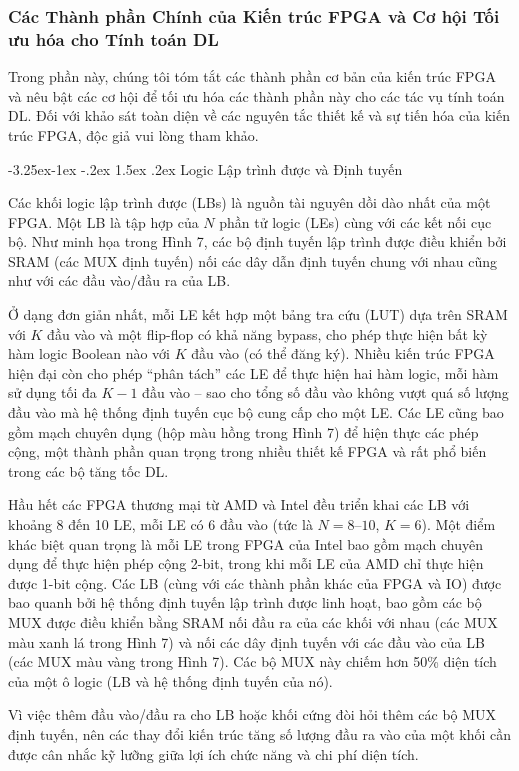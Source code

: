 \documentclass[a4paper]{article}
\makeatletter
\newcounter {subsubsubsection}[subsubsection]
\newcommand\subsubsubsection{\@startsection{subsubsubsection}{4}{\z@}%
                                     {-3.25ex\@plus -1ex \@minus -.2ex}%
                                     {1.5ex \@plus .2ex}%
                                     {\normalfont\normalsize\bfseries}}
\makeatother
\begin{document}
\subsubsection{Các Thành phần Chính của Kiến trúc FPGA và Cơ hội Tối ưu hóa cho Tính toán DL}
Trong phần này, chúng tôi tóm tắt các thành phần cơ bản của kiến trúc FPGA và nêu bật các cơ hội để tối ưu hóa các thành phần này cho các tác vụ tính toán DL. Đối với khảo sát toàn diện về các nguyên tắc thiết kế và sự tiến hóa của kiến trúc FPGA, độc giả vui lòng tham khảo.

\subsubsubsection{Logic Lập trình được và Định tuyến}

Các khối logic lập trình được (LBs) là nguồn tài nguyên dồi dào nhất của một FPGA. Một LB là tập hợp của $N$ phần tử logic (LEs) cùng với các kết nối cục bộ. Như minh họa trong Hình 7, các bộ định tuyến lập trình được điều khiển bởi SRAM (các MUX định tuyến) nối các dây dẫn định tuyến chung với nhau cũng như với các đầu vào/đầu ra của LB.

Ở dạng đơn giản nhất, mỗi LE kết hợp một bảng tra cứu (LUT) dựa trên SRAM với $K$ đầu vào và một flip-flop có khả năng bypass, cho phép thực hiện bất kỳ hàm logic Boolean nào với $K$ đầu vào (có thể đăng ký). Nhiều kiến trúc FPGA hiện đại còn cho phép “phân tách” các LE để thực hiện hai hàm logic, mỗi hàm sử dụng tối đa $K-1$ đầu vào – sao cho tổng số đầu vào không vượt quá số lượng đầu vào mà hệ thống định tuyến cục bộ cung cấp cho một LE. Các LE cũng bao gồm mạch chuyên dụng (hộp màu hồng trong Hình 7) để hiện thực các phép cộng, một thành phần quan trọng trong nhiều thiết kế FPGA và rất phổ biến trong các bộ tăng tốc DL.

Hầu hết các FPGA thương mại từ AMD và Intel đều triển khai các LB với khoảng 8 đến 10 LE, mỗi LE có 6 đầu vào (tức là $N = 8\text{–}10$, $K = 6$). Một điểm khác biệt quan trọng là mỗi LE trong FPGA của Intel bao gồm mạch chuyên dụng để thực hiện phép cộng 2-bit, trong khi mỗi LE của AMD chỉ thực hiện được 1-bit cộng. Các LB (cùng với các thành phần khác của FPGA và IO) được bao quanh bởi hệ thống định tuyến lập trình được linh hoạt, bao gồm các bộ MUX được điều khiển bằng SRAM nối đầu ra của các khối với nhau (các MUX màu xanh lá trong Hình 7) và nối các dây định tuyến với các đầu vào của LB (các MUX màu vàng trong Hình 7). Các bộ MUX này chiếm hơn 50\% diện tích của một ô logic (LB và hệ thống định tuyến của nó).

Vì việc thêm đầu vào/đầu ra cho LB hoặc khối cứng đòi hỏi thêm các bộ MUX định tuyến, nên các thay đổi kiến trúc tăng số lượng đầu ra vào của một khối cần được cân nhắc kỹ lưỡng giữa lợi ích chức năng và chi phí diện tích.
\end{document}
